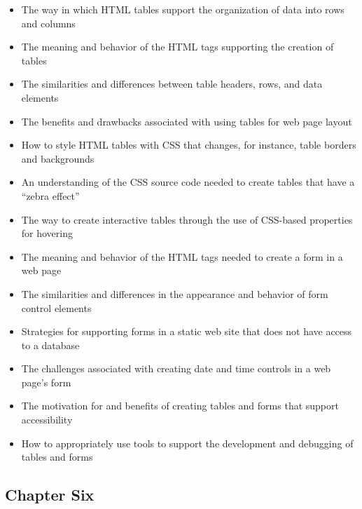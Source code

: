 \documentclass[11pt]{article}
\begin{document}
\begin{itemize}

  \itemsep 0in

  \item The way in which HTML tables support the organization of data into rows
    and columns
  \item The meaning and behavior of the HTML tags supporting the creation of 
    tables
  \item The similarities and differences between table headers, rows, and data
    elements
  \item The benefits and drawbacks associated with using tables for web page
    layout
  \item How to style HTML tables with CSS that changes, for instance, table
    borders and backgrounds
  \item An understanding of the CSS source code needed to create tables that
    have a ``zebra effect''
  \item The way to create interactive tables through the use of CSS-based
    properties for hovering
  \item The meaning and behavior of the HTML tags needed to create a form in a
    web page
  \item The similarities and differences in the appearance and behavior of form
    control elements
  \item Strategies for supporting forms in a static web site that does not have
    access to a database
  \item The challenges associated with creating date and time controls in a web
    page's form
  \item The motivation for and benefits of creating tables and forms that
    support accessibility
  \item How to appropriately use tools to support the development and
    debugging of tables and forms

\end{itemize}

\vspace*{-.2in}
\subsection*{Chapter Six}
\end{document}
